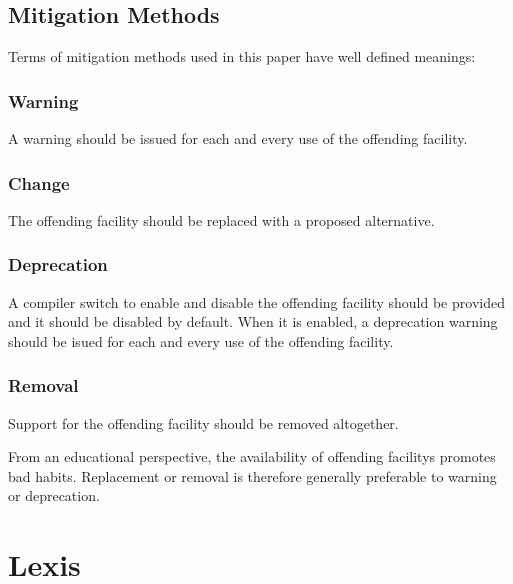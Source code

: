\documentclass[10pt,a4paper]{article}
\begin{document}
\subsection{Mitigation Methods}

Terms of mitigation methods used in this paper have well defined meanings:

\subsubsection{Warning}

A warning should be issued for each and every use of the
\gls{offending facility}.

\subsubsection{Change}

The \gls{offending facility} should be replaced with a proposed alternative.

\subsubsection{Deprecation}

A compiler switch to enable and disable the \gls{offending facility} should
be provided and it should be disabled by default. When it is enabled, a
deprecation warning should be isued for each and every use of the
\gls{offending facility}.

\subsubsection{Removal}

Support for the \gls{offending facility} should be removed altogether.\\

\par\noindent From an educational perspective, the availability of
\glspl{offending facility} promotes bad habits. Replacement or removal
is therefore generally preferable to warning or deprecation.


\section{Lexis}
\end{document}
